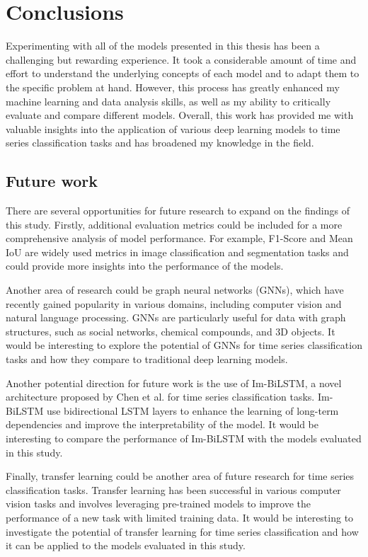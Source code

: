 \chapter{Conclusions}

Experimenting with all of the models presented in this thesis has been a challenging but rewarding experience.
It took a considerable amount of time and effort to understand the underlying concepts of each model and to adapt them to the specific problem at hand.
However, this process has greatly enhanced my machine learning and data analysis skills, as well as my ability to critically evaluate and compare different models.
Overall, this work has provided me with valuable insights into the application of various deep learning models to time series classification tasks and has broadened my knowledge in the field.

\section{Future work}
There are several opportunities for future research to expand on the findings of this study.
Firstly, additional evaluation metrics could be included for a more comprehensive analysis of model performance.
For example, F1-Score and Mean IoU are widely used metrics in image classification and segmentation tasks and could provide more insights into the performance of the models.

Another area of research could be graph neural networks (GNNs), which have recently gained popularity in various domains, including computer vision and natural language processing. 
GNNs are particularly useful for data with graph structures, such as social networks, chemical compounds, and 3D objects. 
It would be interesting to explore the potential of GNNs for time series classification tasks and how they compare to traditional deep learning models.

Another potential direction for future work is the use of Im-BiLSTM, a novel architecture proposed by Chen et al. \cite{CHEN2022102762} for time series classification tasks.
Im-BiLSTM use bidirectional LSTM layers to enhance the learning of long-term dependencies and improve the interpretability of the model. 
It would be interesting to compare the performance of Im-BiLSTM with the models evaluated in this study.

Finally, transfer learning could be another area of future research for time series classification tasks.
Transfer learning has been successful in various computer vision tasks and involves leveraging pre-trained models to improve the performance of a new task with limited training data. 
It would be interesting to investigate the potential of transfer learning for time series classification and how it can be applied to the models evaluated in this study.